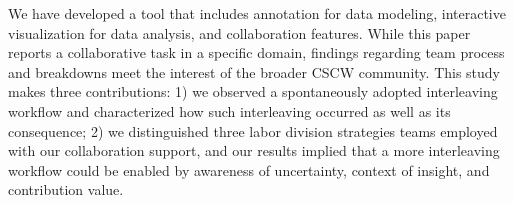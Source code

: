 We have developed a tool that includes annotation for data modeling, interactive
visualization for data analysis, and collaboration features. While this paper
reports a collaborative task in a specific domain, findings regarding team
process and breakdowns meet the interest of the broader CSCW community. This
study makes three contributions: 1) we observed a spontaneously adopted
interleaving workflow and characterized how such interleaving occurred as well
as its consequence; 2) we distinguished three labor division strategies teams
employed with our collaboration support, and our results implied that a more
interleaving workflow could be enabled by awareness of uncertainty, context of
insight, and contribution value.
